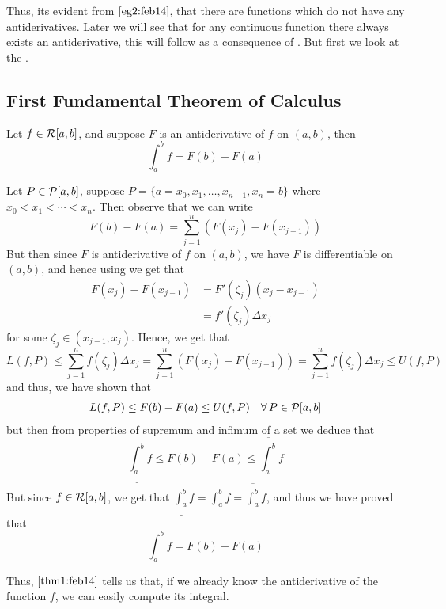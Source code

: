 Thus, its evident from  $\ref{eg2:feb14}$, that there are functions which do not have any antiderivatives. Later we will see that for any continuous function there always exists an antiderivative, this will follow as a consequence of . But first we look at the .

\subsection{First Fundamental Theorem of Calculus}

\begin{thm}\label{thm1:feb14}
    Let $f \in \mathcal{R}[a,b]$, and suppose $F$ is an antiderivative of $f$ on $(a,b)$, then 
    \[
        \int_a^b f = F(b) - F(a)  
    \] 
\end{thm}
\begin{prf}
    Let $P \in \mathcal{P}[a,b]$, suppose $ P = \{a=x_0, x_1, \dots, x_{n-1},x_n =b\}$ where $x_0 < x_1 < \cdots < x_n $. Then observe that we can write 
    \[ 
        F(b) - F(a) = \sum_{j=1}^n (F(x_j) - F(x_{j-1}))    
    \] 
    But then since $F$ is antiderivative of $f$ on $(a,b)$, we have $F$ is differentiable on $(a,b)$, and hence using  we get that 
    \begin{align*}
        F(x_j) - F(x_{j-1}) &= F'(\zeta_j) (x_j - x_{j-1}) \\ 
                            &= f'(\zeta_j) \Delta x_j
    \end{align*}
    for some $\zeta_j \in (x_{j-1},x_j)$. Hence, we get that 
    \[
        L(f,P) \leq \sum_{j=1}^n f(\zeta_j) \Delta x_j = \sum_{j=1}^n (F(x_j) - F(x_{j-1})) = \sum_{j=1}^n f(\zeta_j) \Delta x_j \leq U(f,P)  
    \]
    and thus, we have shown that 
    \begin{align}\label{eq1:feb14}
        L(f,P) \leq F(b) - F(a) \leq U(f,P) &&\forall \, P \in \mathcal{P}[a,b] 
    \end{align}
    but then from properties of supremum and infimum of a set we deduce that 
    \[
        \underline{\int_a^b} f \leq F(b) - F(a) \leq \overline{\int_a^b} f   
    \]
    But since $f \in \mathcal{R}[a,b]$, we get that $\underline{\int_a^b}f = \int_a^b f = \overline{\int_a^b} f$, and thus we have proved that 
    \[
        \int_a^b f = F(b) - F(a)  
    \]
\end{prf}

Thus,  $\ref{thm1:feb14}$ tells us that, if we already know the antiderivative of the function $f$, we can easily compute its integral.

